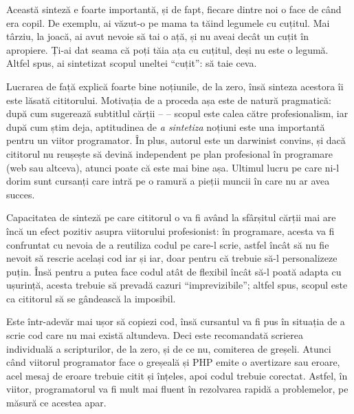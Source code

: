 Această sinteză e foarte importantă, și de fapt, fiecare dintre noi o face de
când era copil. De exemplu, ai văzut-o pe mama ta tăind legumele cu cuțitul.
Mai târziu, la joacă, ai avut nevoie să tai o ață, și nu aveai decât un cuțit
în apropiere. Ți-ai dat seama că poți tăia ața cu cuțitul, deși nu este
o legumă. Altfel spus, ai sintetizat scopul uneltei ``cuțit'': să taie ceva.

Lucrarea de față explică foarte bine noțiunile, de la zero, însă sinteza
acestora îi este lăsată cititorului. Motivația de a proceda așa este de natură
pragmatică: după cum sugerează subtitlul cărții -- \textit{\thesubtitle} --
scopul este calea către profesionalism, iar după cum știm deja, aptitudinea de
\textit{a sintetiza} noțiuni este una importantă pentru un viitor programator.
În plus, autorul este un darwinist convins, și dacă cititorul nu reușește să
devină independent pe plan profesional în programare (web sau altceva), atunci
poate că este mai bine așa. Ultimul lucru pe care ni-l dorim sunt cursanți care
intră pe o ramură a pieții muncii în care nu ar avea succes.

Capacitatea de sinteză pe care cititorul o va fi având la sfârșitul cărții mai
are încă un efect pozitiv asupra viitorului profesionist: în programare, acesta
va fi confruntat cu nevoia de a reutiliza codul pe care-l scrie, astfel încât
să nu fie nevoit să rescrie același cod iar și iar, doar pentru că trebuie să-l
personalizeze puțin. Însă pentru a putea face codul atât de flexibil încât să-l
poată adapta cu ușurință, acesta trebuie să prevadă cazuri ``imprevizibile'';
altfel spus, scopul este ca cititorul să se gândească la imposibil.


Este într-adevăr mai ușor să copiezi cod, însă cursantul va fi pus în situația
de a scrie cod care nu mai există altundeva. Deci este recomandată scrierea
individuală a scripturilor, de la zero, și de ce nu, comiterea de greșeli.
Atunci când viitorul programator face o greșeală și PHP emite o avertizare sau
eroare, acel mesaj de eroare trebuie citit și înțeles, apoi codul trebuie
corectat. Astfel, în viitor, programatorul va fi mult mai fluent în rezolvarea
rapidă a problemelor, pe măsură ce acestea apar.

